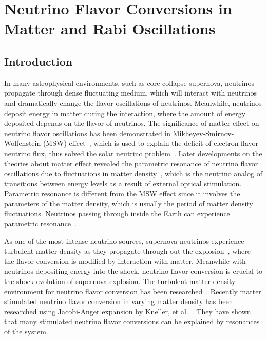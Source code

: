 
\chapter{\label{chap:matter}Neutrino Flavor Conversions in Matter and Rabi Oscillations}



\section{\label{chap:matter-rabi-introduction}Introduction}

In many astrophysical environments, such as core-collapse supernova, neutrinos propagate through dense fluctuating medium, which will interact with neutrinos and dramatically change the flavor oscillations of neutrinos. Meanwhile, neutrinos deposit energy in matter during the interaction, where the amount of energy deposited depends on the flavor of neutrinos. The significance of matter effect on neutrino flavor oscillations has been demonstrated in Mikheyev-Smirnov-Wolfenstein (MSW) effect~\cite{Mikheev:1986gs,wolf78,wolfensteinprd1979}, which is used to explain the deficit of electron flavor neutrino flux, thus solved the solar neutrino problem~\cite{Petcov2002,kuo1989}. Later developments on the theories about matter effect revealed the parametric resonance of neutrino flavor oscillations due to fluctuations in matter density~\cite{Krastev1989,Akhmedov2000}, which is the neutrino analog of transitions between energy levels as a result of external optical stimulation. Parametric resonance is different from the MSW effect since it involves the parameters of the matter density, which is usually the period of matter density fluctuations. Neutrinos passing through inside the Earth can experience parametric resonance~\cite{Akhmedov1999, Petcov1998b}.

As one of the most intense neutrino sources, supernova neutrinos experience turbulent matter density as they propagate through out the explosion~\cite{Muller2015, Couch2015}, where the flavor conversion is modified by interaction with matter. Meanwhile with neutrinos depositing energy into the shock, neutrino flavor conversion is crucial to the shock evolution of supernova explosion. The turbulent matter density environment for neutrino flavor conversion has been researched~\cite{Loreti1994, Friedland2006,Kneller2010}. Recently matter stimulated neutrino flavor conversion in varying matter density has been researched using Jacobi-Anger expansion by Kneller, et al.~\cite{Kneller2013,Patton2014}. They have shown that many stimulated neutrino flavor conversions can be explained by resonances of the system.

